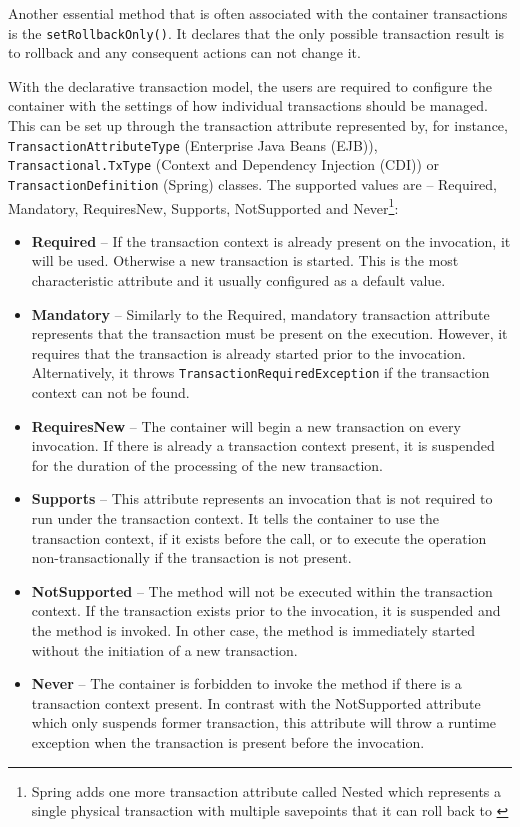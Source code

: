 \documentclass[oneside,
  digital, %
  table,   %
  nolof,     %
  nolot,     %
]{fithesis3}
\begin{document}
Another essential method that is often associated with the container transactions is the \texttt{setRollbackOnly()}. It declares that the only possible transaction result is to rollback and any consequent actions can not change it.

With the declarative transaction model, the users are required to configure the container with the settings of how individual transactions should be managed. This can be set up through the transaction attribute represented by, for instance, \texttt{TransactionAttributeType} (Enterprise Java Beans (EJB)), \texttt{Transactional.TxType} (Context and Dependency Injection (CDI)) or \texttt{TransactionDefinition} (Spring) classes. The supported values are -- Required, Mandatory, RequiresNew, Supports, NotSupported and Never\footnote{Spring adds one more transaction attribute called Nested which represents a single physical transaction with multiple savepoints that it can roll back to \cite{spring_transaction_management_documentation}}:

\begin{itemize}
    \item \textbf{Required} -- If the transaction context is already present on the invocation, it will be used. Otherwise a new transaction is started. This is the most characteristic attribute and it usually configured as a default value.
    
    \item \textbf{Mandatory} -- Similarly to the Required, mandatory transaction attribute represents that the transaction must be present on the execution. However, it requires that the transaction is already started prior to the invocation. Alternatively, it throws \texttt{TransactionRequiredException} if the transaction context can not be found.
    
    \item \textbf{RequiresNew} -- The container will begin a new transaction on every invocation. If there is already a transaction context present, it is suspended for the duration of the processing of the new transaction. 
    
    \item \textbf{Supports} -- This attribute represents an invocation that is not required to run under the transaction context. It tells the container to use the transaction context, if it exists before the call, or to execute the operation non-transactionally if the transaction is not present.
    
    \item \textbf{NotSupported} -- The method will not be executed within the transaction context. If the transaction exists prior to the invocation, it is suspended and the method is invoked. In other case, the method is immediately started without the initiation of a new transaction.
    
    \item \textbf{Never} -- The container is forbidden to invoke the method if there is a transaction context present. In contrast with the NotSupported attribute which only suspends former transaction, this attribute will throw a runtime exception when the transaction is present before the invocation.
\end{itemize}
\end{document}
